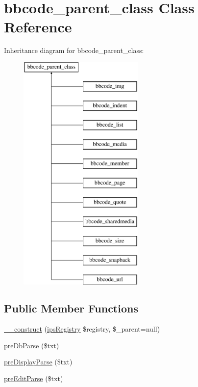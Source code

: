 \hypertarget{classbbcode__parent__class}{\section{bbcode\-\_\-parent\-\_\-class Class Reference}
\label{classbbcode__parent__class}
}
Inheritance diagram for bbcode\-\_\-parent\-\_\-class\-:\begin{figure}[H]
\begin{center}
\leavevmode
\includegraphics[height=12.000000cm]{classbbcode__parent__class}
\end{center}
\end{figure}
\subsection*{Public Member Functions}
\begin{DoxyCompactItemize}
\item 
\hyperlink{classbbcode__parent__class_a9c7a683aed4631ab88876012e950f1ab}{\-\_\-\-\_\-construct} (\hyperlink{classips_registry}{ips\-Registry} \$registry, \$\-\_\-parent=null)
\item 
\hyperlink{classbbcode__parent__class_a761782abec1999eac70cda803a5e0e32}{pre\-Db\-Parse} (\$txt)
\item 
\hyperlink{classbbcode__parent__class_a96ae233b150cbe9652e841d073b9bfce}{pre\-Display\-Parse} (\$txt)
\item 
\hyperlink{classbbcode__parent__class_ab5c4381b2631b7a6de161ec15a6ecb39}{pre\-Edit\-Parse} (\$txt)
\end{DoxyCompactItemize}
